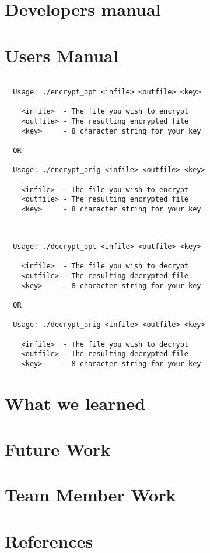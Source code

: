 \documentclass[12pt]{article}
\begin{document}
\section{Developers manual}
\section{Users Manual}

\begin{verbatim}

  Usage: ./encrypt_opt <infile> <outfile> <key>

    <infile>  - The file you wish to encrypt
    <outfile> - The resulting encrypted file
    <key>     - 8 character string for your key

  OR

  Usage: ./encrypt_orig <infile> <outfile> <key>

    <infile>  - The file you wish to encrypt
    <outfile> - The resulting encrypted file
    <key>     - 8 character string for your key


\end{verbatim}

\begin{verbatim}

  Usage: ./decrypt_opt <infile> <outfile> <key>

    <infile>  - The file you wish to decrypt
    <outfile> - The resulting decrypted file
    <key>     - 8 character string for your key

  OR

  Usage: ./decrypt_orig <infile> <outfile> <key>

    <infile>  - The file you wish to decrypt
    <outfile> - The resulting decrypted file
    <key>     - 8 character string for your key

\end{verbatim}

\section{What we learned}
\section{Future Work}
\section{Team Member Work}
\section{References}

\begin{thebibliography}{99}
\end{thebibliography}
\end{document}
